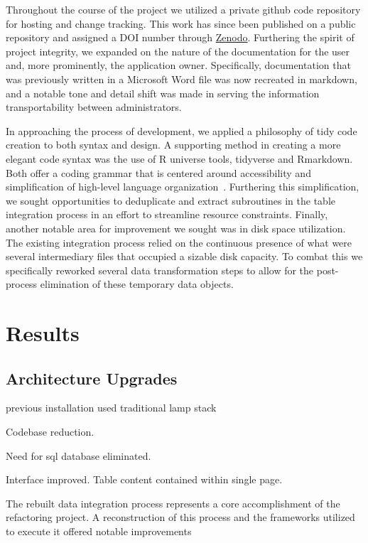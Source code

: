 \documentclass[10pt]{report}
\begin{document}
Throughout the course of the project we utilized a private github code repository for hosting and change tracking. This work has since been published on a public repository and assigned a DOI number through \href{https://zenodo.org/record/4422027}{Zenodo}. Furthering the spirit of project integrity, we expanded on the nature of the documentation for the user and, more prominently, the application owner. Specifically, documentation that was previously written in a Microsoft Word file was now recreated in markdown, and a notable tone and detail shift was made in serving the information transportability between administrators.

In approaching the process of development, we applied a philosophy of tidy code creation to both syntax and design. A supporting method in creating a more elegant code syntax was the use of R universe tools, tidyverse and Rmarkdown. Both offer a coding grammar that is centered around accessibility and simplification of high-level language organization~\cite{Wickham2019}. Furthering this simplification, we sought opportunities to deduplicate and extract subroutines in the table integration process in an effort to streamline resource constraints. Finally, another notable area for improvement we sought was in disk space utilization. The existing integration process relied on the continuous presence of what were several intermediary files that occupied a sizable disk capacity. To combat this we specifically reworked several data transformation steps to allow for the post-process elimination of these temporary data objects.

\section{Results}

\subsection{Architecture Upgrades}
previous installation used traditional lamp stack

Codebase reduction.

Need for sql database eliminated.

Interface improved. Table content contained within single page.

The rebuilt data integration process represents a core accomplishment of the refactoring project. A reconstruction of this process and the frameworks utilized to execute it offered notable improvements
\end{document}

